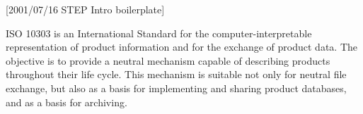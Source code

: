 [2001/07/16 STEP Intro boilerplate]

ISO 10303 is an International Standard for the computer-interpretable
representation of product information and for the exchange of product data.
The objective is to
provide a neutral mechanism capable of describing products
throughout their life cycle.
This mechanism is suitable
not only for neutral file exchange, but also as a basis for
implementing and sharing product databases, and as a basis for archiving.

\endinput
